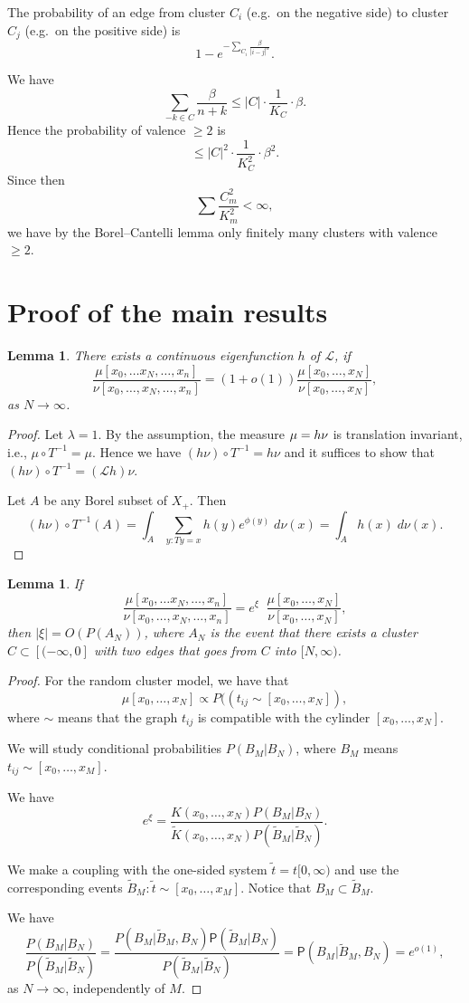 \documentclass[11pt, a4paper, oneside]{scrartcl}
\newtheorem{lem}[thm]{Lemma}
\theoremstyle{definition}
\theoremstyle{remark}
\renewcommand{\P}{\mathsf{P}}
\providecommand{\tl}{\tilde}
\begin{document}
The probability of an edge from cluster $C_i$ (e.g.\ on the negative side) to cluster $C_j$ (e.g.\ on the positive side) is
$$1-e^{-\sum_{C_i} \frac{\beta}{|i-j|^{\alpha}}}.$$

We have
$$\sum_{-k\in C}\frac{\beta}{n+k}\leq |C|\cdot \frac{1}{K_C}\cdot \beta.$$
Hence the probability of valence $\geq 2$ is
$$\leq  |C|^2\cdot \frac{1}{K_C^2}\cdot \beta^2.$$
Since then
$$\sum \frac{C_m^2}{K_m^2}<\infty,$$
we have by the Borel--Cantelli lemma only finitely many clusters with valence
$\geq 2$.


\section{Proof of the main results}\noindent

\begin{lem}
  There exists a continuous eigenfunction $h$ of ${\mathcal L}$, if
$$\frac{\mu[x_0,\ldots x_N, \ldots, x_n]}{\nu[x_0,\ldots, x_N, \ldots, x_n]}=(1+o(1)) \frac{\mu[x_0,\ldots, x_N]}{\nu[x_0, \ldots, x_N]},$$
as $N\to \infty$.
\end{lem}
\begin{proof}
  Let $\lambda=1$. By the assumption, the measure $\mu= h \nu$ is translation
  invariant, i.e., $\mu\circ T^{-1}=\mu$. Hence we have $(h\nu)\circ
  T^{-1}=h\nu$ and it suffices to show that $(h\nu)\circ T^{-1}=({\mathcal
    L}h)\nu$.

  Let $A$ be any Borel subset of $X_+$. Then
  $$(h\nu)\circ T^{-1} (A)=\int_A \sum_{y: Ty=x} h(y)e^{\phi(y)}\; d\nu(x)=\int_A h(x)\; d\nu(x).$$
\end{proof}

\begin{lem}
  If $$\frac{\mu[x_0,\ldots x_N, \ldots, x_n]}{\nu[x_0,\ldots, x_N, \ldots, x_n]}=e^{\xi}\; \; \frac{\mu[x_0,\ldots, x_N]}{\nu[x_0, \ldots, x_N]},$$
  then $|\xi|=O(P(A_N))$, where $A_N$ is the event that there exists a cluster
  $C\subset [(-\infty, 0]$ with two edges that goes from $C$ into $[N,\infty)$.
\end{lem}
\begin{proof}
  For the random cluster model, we have that
  \[
    \mu[x_0,\ldots, x_N]\propto P((t_{ij} \sim [x_0, \ldots, x_N]),
  \]
  where $\sim$ means that the graph $t_{ij}$ is compatible with the cylinder
  $[x_0,\ldots, x_N]$.

  We will study conditional probabilities $P(B_M|B_N)$, where $B_M$ means
  $t_{ij}\sim [x_0,\ldots, x_M]$.

  We have
  \[
    e^{\xi}=
    \frac{K(x_0,\ldots, x_N)P(B_M|B_N)}{\tl K(x_0,\ldots, x_N)P(\tilde B_M|\tilde B_N)}.
  \]

  We make a coupling with the one-sided system $\tilde t=t[0,\infty)$ and use
  the corresponding events $\tilde B_M: \tilde t \sim [x_0,\ldots, x_M]$. Notice
  that $B_M\subset \tilde B_M$.

  We have
  \[
    \frac{P(B_M|B_N)}{P(\tilde B_M| \tilde B_N)} = \frac{P(B_M|\tilde B_M, B_N) \P(\tilde B_M|B_N)} {P(\tilde B_M|\tilde B_N)} = \P(B_M|\tilde B_M, B_N)=e^{o(1)},
  \]
  as $N\to \infty$, independently of $M$.
\end{proof}
\end{document}
